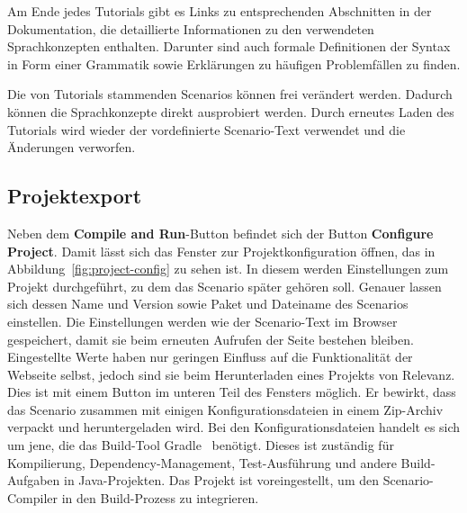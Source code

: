 Am Ende jedes Tutorials gibt es Links zu entsprechenden Abschnitten in der Dokumentation, die detaillierte Informationen zu den verwendeten Sprachkonzepten enthalten.
Darunter sind auch formale Definitionen der Syntax in Form einer Grammatik sowie Erklärungen zu häufigen Problemfällen zu finden.

Die von Tutorials stammenden Scenarios können frei verändert werden.
Dadurch können die Sprachkonzepte direkt ausprobiert werden.
Durch erneutes Laden des Tutorials wird wieder der vordefinierte Scenario-Text verwendet und die Änderungen verworfen.

\subsection{Projektexport}\label{subsec:project-export}

Neben dem \textbf{Compile and Run}-Button befindet sich der Button \textbf{Configure Project}.
Damit lässt sich das Fenster zur Projektkonfiguration öffnen, das in Abbildung~\ref{fig:project-config} zu sehen ist.
In diesem werden Einstellungen zum Projekt durchgeführt, zu dem das Scenario später gehören soll.
Genauer lassen sich dessen Name und Version sowie Paket und Dateiname des Scenarios einstellen.
Die Einstellungen werden wie der Scenario-Text im Browser gespeichert, damit sie beim erneuten Aufrufen der Seite bestehen bleiben.
Eingestellte Werte haben nur geringen Einfluss auf die Funktionalität der Webseite selbst, jedoch sind sie beim Herunterladen eines Projekts von Relevanz.
Dies ist mit einem Button im unteren Teil des Fensters möglich.
Er bewirkt, dass das Scenario zusammen mit einigen Konfigurationsdateien in einem Zip-Archiv verpackt und heruntergeladen wird.
Bei den Konfigurationsdateien handelt es sich um jene, die das Build-Tool Gradle~\cite{gradle} benötigt.
Dieses ist zuständig für Kompilierung, Dependency-Management, Test-Ausführung und andere Build-Aufgaben in Java-Projekten.
Das Projekt ist voreingestellt, um den Scenario-Compiler in den Build-Prozess zu integrieren.

